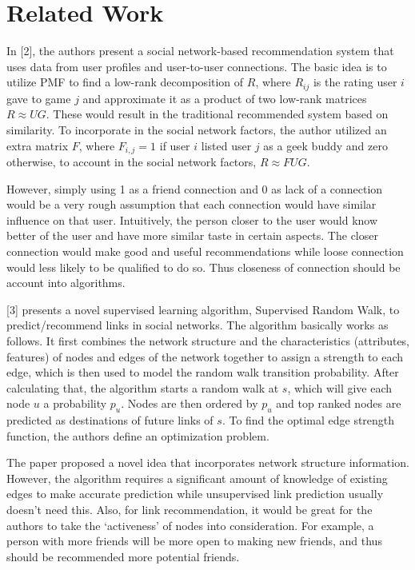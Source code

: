 \documentclass{article}
\begin{document}
\section{Related Work}

In [2], the authors present a social network-based recommendation system that uses data from user profiles and user-to-user connections. 
The basic idea is to utilize PMF to find a low-rank decomposition of $R$, where $R_{ij}$ is the rating user $i$ gave to game $j$ and approximate it as a product of two low-rank matrices $R\approx UG$. These would result in the traditional recommended system based on similarity. To incorporate in the social network factors, the author utilized an extra matrix $F$, where $F_{i,j} = 1$ if user $i$ listed user $j$ as a geek buddy and zero otherwise, to account in the social network factors, $R\approx FUG $.

However, simply using 1 as a friend connection and 0 as lack of a connection would be a very rough assumption that each connection would have similar influence on that user. Intuitively, the person closer to the user would know better of the user and have more similar taste in certain aspects. The closer connection would make good and useful recommendations while loose connection would less likely to be qualified to do so. Thus closeness of connection should be account into algorithms.


[3] presents a novel supervised learning algorithm, Supervised Random Walk, to predict/recommend links in social networks. The algorithm basically works as follows. It first combines the network structure and the characteristics (attributes, features) of nodes and edges of the network together to assign a strength to each edge, which is then used to model the random walk transition probability. After calculating that, the algorithm starts a random walk at $s$, which will give each node $u$ a probability $p_u$. Nodes are then ordered by $p_u$ and top ranked nodes are predicted as destinations of future links of $s$. To find the optimal edge strength function, the authors define an optimization problem. 

The paper proposed a novel idea that incorporates network structure information. However, the algorithm requires a significant amount of knowledge of existing edges to make accurate prediction while unsupervised link prediction usually doesn’t need this. Also, for link recommendation, it would be great for the authors to take the ‘activeness’ of nodes into consideration. For example, a person with more friends will be more open to making new friends, and thus should be recommended more potential friends.
\end{document}
